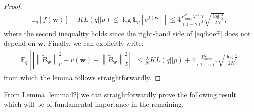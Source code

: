 \documentclass{article}
\newcommand{\wt}[1]{\widetilde{#1}}
\newcommand{\norm}[1]{\left\lVert #1 \right\rVert}
\newcommand{\abs}[1]{\left\lvert #1 \right\rvert}
\begin{document}
\begin{proof}
\begin{align*}
\mathbb{E}_q\left[ f(\bm{w}) \right] - KL(q||p) \leq \log\mathbb{E}_p\left[e^{f(\bm{w})}\right] \leq 4\frac{R_{max}^2 \lambda^{-1}N}{(1-\gamma)^2}\sqrt{\frac{\log\frac{2}{\delta}}{2N}},
\end{align*}
where the second inequality holds since the right-hand side of \eqref{eq:hoeff} does not depend on $\bm{w}$. Finally, we can explicitly write:
\begin{align*}
\mathbb{E}_q\left[ \abs{\norm{\wt B_{\bm{w}}}_{\nu}^2 + v(\bm{w}) - \norm{\wt B_{\bm{w}}}_D^2} \right] \leq \frac{\lambda}{N} KL(q||p) + 4\frac{R_{max}^2}{(1-\gamma)^2}\sqrt{\frac{\log\frac{2}{\delta}}{2N}}
\end{align*}
from which the lemma follows straightforwardly.
\end{proof}

From Lemma \ref{lemma:l2} we can straightforwardly prove the following result which will be of fundamental importance in the remaining.
\end{document}

